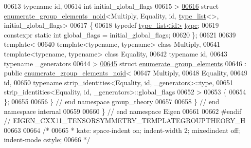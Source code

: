 \begin{DoxyCode}
00613   \textcolor{keyword}{typename} id,
00614   \textcolor{keywordtype}{int} initial\_global\_flags
00615 >
\hyperlink{struct_eigen_1_1internal_1_1group__theory_1_1enumerate__group__elements__noid_3_01_multiply_00_0fbeb6252744622d4e917105540d8e4a3}{00616} \textcolor{keyword}{struct }\hyperlink{struct_eigen_1_1internal_1_1group__theory_1_1enumerate__group__elements__noid}{enumerate\_group\_elements\_noid}<Multiply, Equality, id, 
      \hyperlink{struct_eigen_1_1internal_1_1type__list}{type\_list}<>, initial\_global\_flags>
00617 \{
00618   \textcolor{keyword}{typedef} \hyperlink{struct_eigen_1_1internal_1_1type__list}{type\_list<id>} \hyperlink{struct_eigen_1_1internal_1_1type__list}{type};
00619   constexpr \textcolor{keyword}{static} \textcolor{keywordtype}{int} global\_flags = initial\_global\_flags;
00620 \};
00621 
00639 \textcolor{keyword}{template}<
00640   \textcolor{keyword}{template}<\textcolor{keyword}{typename}, \textcolor{keyword}{typename}> \textcolor{keyword}{class }Multiply,
00641   \textcolor{keyword}{template}<\textcolor{keyword}{typename}, \textcolor{keyword}{typename}> \textcolor{keyword}{class }Equality,
00642   \textcolor{keyword}{typename} id,
00643   \textcolor{keyword}{typename} \_generators
00644 >
\hyperlink{struct_eigen_1_1internal_1_1group__theory_1_1enumerate__group__elements}{00645} \textcolor{keyword}{struct }\hyperlink{struct_eigen_1_1internal_1_1group__theory_1_1enumerate__group__elements}{enumerate\_group\_elements}
00646   : \textcolor{keyword}{public} \hyperlink{struct_eigen_1_1internal_1_1group__theory_1_1enumerate__group__elements__noid}{enumerate\_group\_elements\_noid}<
00647       Multiply,
00648       Equality,
00649       id,
00650       typename strip\_identities<Equality, id, \_generators>::type,
00651       strip\_identities<Equality, id, \_generators>::global\_flags
00652     >
00653 \{
00654 \};
00655 
00656 \} \textcolor{comment}{// end namespace group\_theory}
00657 
00658 \} \textcolor{comment}{// end namespace internal}
00659 
00660 \} \textcolor{comment}{// end namespace Eigen}
00661 
00662 \textcolor{preprocessor}{#endif // EIGEN\_CXX11\_TENSORSYMMETRY\_TEMPLATEGROUPTHEORY\_H}
00663 
00664 \textcolor{comment}{/*}
00665 \textcolor{comment}{ * kate: space-indent on; indent-width 2; mixedindent off; indent-mode cstyle;}
00666 \textcolor{comment}{ */}
\end{DoxyCode}
